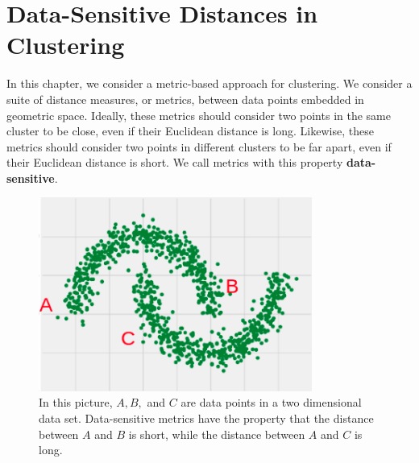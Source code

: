 \section{Data-Sensitive Distances in Clustering}\label{sec:ds}
%
 In this chapter, we consider a metric-based approach for clustering.  We consider a suite
  of distance measures, or metrics, between data points embedded in
  geometric space. Ideally, these metrics should consider two
  points in the same cluster to be close, even if their
  Euclidean distance is long. Likewise, these metrics should consider two points in different clusters
  to be far apart, even if their Euclidean distance is short.
  We call metrics with this property \textbf{data-sensitive}.

\begin{figure}[htbp]
\centering
\includegraphics[width=0.8\textwidth]{images/two-moons.png}
\caption{
  In this picture, $A, B,$ and $C$ are data points in a two dimensional
    data set. Data-sensitive metrics have the property that the distance
    between $A$ and $B$ is short, while the distance between $A$ and $C$
    is long. 
 }
\label{fig:spec}
\end{figure}

